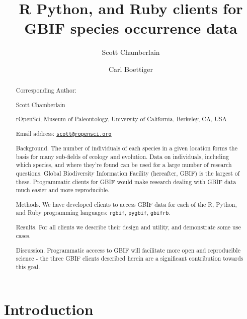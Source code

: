\documentclass[author-year, review, 11pt]{components/elsarticle} %
\begin{document}
\begin{frontmatter}

  \title{R Python, and Ruby clients for GBIF species occurrence data}
    \author[cstar]{Scott Chamberlain}
    \author[boettig]{Carl Boettiger}
  
      \address[cstar]{rOpenSci, Museum of Paleontology, University of California, Berkeley,
CA, USA}
    \address[boettig]{rOpenSci, Department of Enivornmental Science, Policy and Management,
University of California, Berkeley, CA, USA}
  
  \begin{abstract}
  Corresponding Author:
  
  Scott Chamberlain
  
  rOpenSci, Museum of Paleontology, University of California, Berkeley,
  CA, USA
  
  Email address:
  \href{mailto:scott@ropensci.org}{\nolinkurl{scott@ropensci.org}}
  
  \newpage
  
  Background. The number of individuals of each species in a given
  location forms the basis for many sub-fields of ecology and evolution.
  Data on individuals, including which species, and where they're found
  can be used for a large number of research questions. Global
  Biodiversity Information Facility (hereafter, GBIF) is the largest of
  these. Programmatic clients for GBIF would make research dealing with
  GBIF data much easier and more reproducible.
  
  Methods. We have developed clients to access GBIF data for each of the
  R, Python, and Ruby programming languages: \texttt{rgbif},
  \texttt{pygbif}, \texttt{gbifrb}.
  
  Results. For all clients we describe their design and utility, and
  demonstrate some use cases.
  
  Discussion. Programmatic acccess to GBIF will facilitate more open and
  reproducible science - the three GBIF clients described herein are a
  significant contribution towards this goal.
  \end{abstract}
  
 \end{frontmatter}


\newpage

\section{Introduction}\label{introduction}
\end{document}

